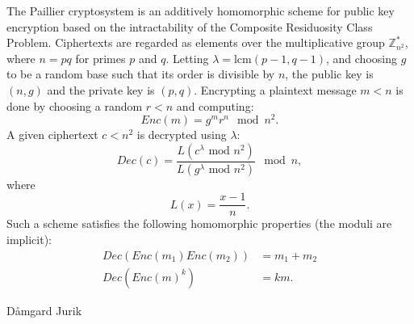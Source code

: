 The Paillier cryptosystem \cite{Paillier} is an additively homomorphic
scheme for public key encryption based on the intractability of the
Composite Residuosity Class Problem. Ciphertexts are regarded as elements
over the multiplicative group $\mathbb{Z}_{n^{2}}^{*}$, where $n=pq$
for primes $p$ and $q$. Letting $\lambda=\text{lcm}(p-1,q-1)$,
and choosing $g$ to be a random base such that its order is divisible
by $n$, the public key is $(n,g)$ and the private key is $(p,q)$.
Encrypting a plaintext message $m<n$ is done by choosing a random
$r<n$ and computing: 
\[
Enc(m)=g^{m}r^{n}\mod n^{2}.
\]
A given ciphertext $c<n^{2}$ is decrypted using $\lambda$: 
\[
Dec(c)=\frac{L(c^{\lambda}\text{ mod }n^{2})}{L(g^{\lambda}\text{ mod }n^{2})}\mod n,
\]
where 
\[
L(x)=\frac{x-1}{n}.
\]
Such a scheme satisfies the following homomorphic properties (the
moduli are implicit): 
\begin{align*}
Dec(Enc(m_{1})Enc(m_{2})) & =m_{1}+m_{2}\\
Dec(Enc(m)^{k}) & =km.
\end{align*}

D\aa mgard Jurik \cite{Damgard} 